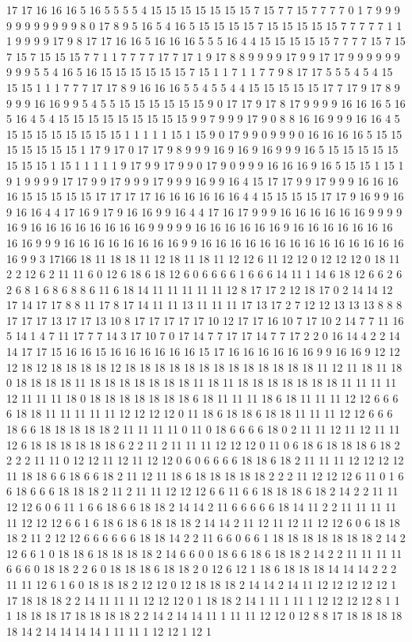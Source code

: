 17 17 16 16 16 5 16 5 5 5 5 4 15 15 15 15 15 15 15 7 15 7 7 15 7 7 7 7 0 1 7 9 9 9 9 9 9 9 9 9 9 9 8 0 17 8 9 5 16 5 4 16 5 15 15 15 15 7 15 15 15 15 15 7 7 7 7 7 1 1 1 9 9 9 9 17 9 8 17 17 16 16 5 16 16 16 5 5 5 16 4 4 15 15 15 15 15 7 7 7 7 15 7 15 7 15 7 15 15 15 7 7 1 1 7 7 7 7 17 7 17 1 9 17 8 8 9 9 9 9 17 9 9 17 17 9 9 9 9 9 9 9 9 9 5 5 4 16 5 16 15 15 15 15 15 15 7 15 1 1 7 1 1 7 7 9 8 17 17 5 5 5 4 5 4 15 15 15 1 1 1 7 7 7 17 17 8 9 16 16 16 5 5 4 5 5 4 4 15 15 15 15 15 17 7 17 9 17 8 9 9 9 9 16 16 9 9 5 4 5 5 15 15 15 15 15 15 9 0 17 17 9 17 8 17 9 9 9 9 16 16 16 5 16 5 16 4 5 4 15 15 15 15 15 15 15 15 15 9 9 7 9 9 9 17 9 0 8 8 16 16 9 9 9 16 16 4 5 15 15 15 15 15 15 15 15 1 1 1 1 1 15 1 15 9 0 17 9 9 0 9 9 9 0 16 16 16 16 5 15 15 15 15 15 15 15 1 17 9 17 0 17 17 9 8 9 9 9 16 9 16 9 16 9 9 9 16 5 15 15 15 15 15 15 15 15 1 15 1 1 1 1 1 9 17 9 9 17 9 9 0 17 9 0 9 9 9 16 16 16 9 16 5 15 15 1 15 1 9 1 9 9 9 9 17 17 9 9 17 9 9 9 17 9 9 9 16 9 9 16 4 15 17 17 9 9 17 9 9 9 16 16 16 16 15 15 15 15 15 17 17 17 17 16 16 16 16 16 16 4 4 15 15 15 15 17 17 9 16 9 9 16 9 16 16 4 4 17 16 9 17 9 16 16 9 9 16 4 4 17 16 17 9 9 9 16 16 16 16 16 16 9 9 9 9 16 9 16 16 16 16 16 16 16 16 9 9 9 9 9 16 16 16 16 16 16 9 16 16 16 16 16 16 16 16 16 9 9 9 16 16 16 16 16 16 16 16 9 9 16 16 16 16 16 16 16 16 16 16 16 16 16 16 16 9 9 3 17166 18 11 18 18 11 12 18 11 18 11 12 12 6 11 12 12 0 12 12 12 0 18 11 2 2 12 6 2 11 11 6 0 12 6 18 6 18 12 6 0 6 6 6 6 1 6 6 6 14 11 1 14 6 18 12 6 6 2 6 2 6 8 1 6 8 6 8 8 6 11 6 18 14 11 11 11 11 11 12 8 17 17 2 12 18 17 0 2 14 14 12 17 14 17 17 8 8 11 17 8 17 14 11 11 13 11 11 11 17 13 17 2 7 12 12 13 13 13 8 8 8 17 17 17 13 17 17 13 10 8 17 17 17 17 17 10 12 17 17 16 10 7 17 10 2 14 7 7 11 16 5 14 1 4 7 11 17 7 7 14 3 17 10 7 0 17 14 7 7 17 17 14 7 7 17 2 2 0 16 14 4 2 2 14 14 17 17 15 16 16 15 16 16 16 16 16 16 15 17 16 16 16 16 16 16 9 9 16 16 9 12 12 12 18 12 18 18 18 18 12 18 18 18 18 18 18 18 18 18 18 18 18 18 11 12 11 18 11 18 0 18 18 18 18 11 18 18 18 18 18 18 18 11 18 11 18 18 18 18 18 18 18 11 11 11 11 12 11 11 11 18 0 18 18 18 18 18 18 18 6 18 11 11 11 18 6 18 11 11 11 12 12 6 6 6 6 18 18 11 11 11 11 11 12 12 12 12 0 11 18 6 18 18 6 18 18 11 11 11 12 12 6 6 6 18 6 6 18 18 18 18 18 2 11 11 11 11 0 11 0 18 6 6 6 6 18 0 2 11 11 12 11 12 11 11 12 6 18 18 18 18 18 18 6 2 2 11 2 11 11 11 12 12 12 0 11 0 6 18 6 18 18 18 6 18 2 2 2 2 11 11 0 12 12 11 12 11 12 12 0 6 0 6 6 6 6 18 18 6 18 2 11 11 11 12 12 12 12 11 18 18 6 6 18 6 6 18 2 11 12 11 18 6 18 18 18 18 18 2 2 2 11 12 12 12 6 11 0 1 6 6 18 6 6 6 18 18 18 2 11 2 11 11 12 12 12 6 6 11 6 6 18 18 18 6 18 2 14 2 2 11 11 12 12 6 0 6 11 1 6 6 18 6 6 18 18 2 14 14 2 11 6 6 6 6 6 18 14 11 2 2 11 11 11 11 11 12 12 12 6 6 1 6 18 6 18 6 18 18 18 2 14 14 2 11 12 11 12 11 12 12 6 0 6 18 18 18 2 11 2 12 12 6 6 6 6 6 6 18 18 14 2 2 11 6 6 0 6 6 1 18 18 18 18 18 18 18 2 14 2 12 6 6 1 0 18 18 6 18 18 18 18 2 14 6 6 0 0 18 6 6 18 6 18 18 2 14 2 2 11 11 11 11 6 6 6 0 18 18 2 2 6 0 18 18 18 6 18 18 2 0 12 6 12 1 18 6 18 18 18 14 14 14 2 2 2 11 11 12 6 1 6 0 18 18 18 2 12 12 0 12 18 18 18 2 14 14 2 14 11 12 12 12 12 12 1 17 18 18 18 2 2 14 11 11 11 12 12 12 0 1 18 18 2 14 1 11 1 11 1 12 12 12 12 8 1 1 1 18 18 18 17 18 18 18 18 2 2 14 2 14 14 11 1 11 11 12 12 0 12 8 8 17 18 18 18 18 18 14 2 14 14 14 14 1 11 11 1 12 12 1 12 1 